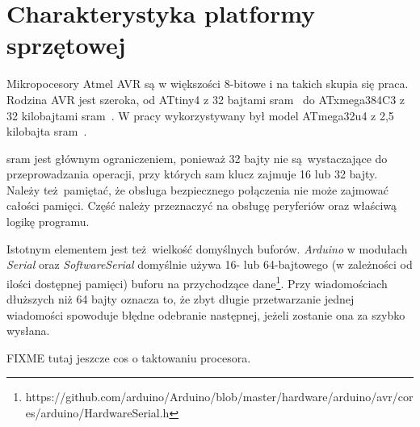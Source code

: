 \chapter{Charakterystyka platformy sprzętowej}
\label{cha:hardware}

Mikropocesory Atmel AVR są w większości 8-bitowe i na takich skupia się praca. Rodzina AVR jest szeroka, od ATtiny4 z 32 bajtami \gls{sram}~\cite{Attiny4} do ATxmega384C3 z 32 kilobajtami \gls{sram}~\cite{Atxmega384}. W pracy wykorzystywany był model ATmega32u4 z 2,5 kilobajta \gls{sram}~\cite{Atmega32}.

\gls{sram} jest głównym ograniczeniem, ponieważ 32 bajty nie są wystaczające do przeprowadzania operacji, przy których sam klucz zajmuje 16 lub 32 bajty. Należy też pamiętać, że obsługa bezpiecznego połączenia nie może zajmować całości pamięci. Część należy przeznaczyć na obsługę peryferiów oraz właściwą logikę programu.

Istotnym elementem jest też wielkość domyślnych buforów. \emph{Arduino} w modułach \emph{Serial} oraz \emph{SoftwareSerial} domyślnie używa 16- lub 64-bajtowego (w zależności od ilości dostępnej pamięci) buforu na przychodzące dane\footnote{https://github.com/arduino/Arduino/blob/master/hardware/arduino/avr/cores/arduino/HardwareSerial.h}. Przy wiadomościach dłuższych niż 64 bajty oznacza to, że zbyt długie przetwarzanie jednej wiadomości spowoduje błędne odebranie następnej, jeżeli zostanie ona za szybko wysłana.

FIXME tutaj jeszcze cos o taktowaniu procesora.
